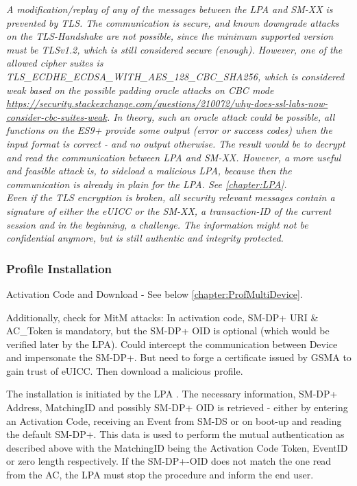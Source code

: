 \textit{A modification/replay of any of the messages between the LPA and SM-XX is prevented by TLS. The communication is secure, and known downgrade attacks on the TLS-Handshake are not possible, since the minimum supported version must be TLSv1.2, which is still considered secure (enough). However, one of the allowed cipher suites is  TLS\_ECDHE\_ECDSA\_WITH\_AES\_128\_CBC\_SHA256, which is considered weak based on the possible padding oracle attacks on CBC mode \url{https://security.stackexchange.com/questions/210072/why-does-ssl-labs-now-consider-cbc-suites-weak}. In theory, such an oracle attack could be possible, all functions on the ES9+ provide some output (error or success codes) when the input format is correct - and no output otherwise. The result would be to decrypt and read the communication between LPA and SM-XX. However, a more useful and feasible attack is, to sideload a malicious LPA, because then the communication is already in plain for the LPA. See \ref{chapter:LPA}. \\
Even if the TLS encryption is broken, all security relevant messages contain a signature of either the eUICC or the SM-XX, a transaction-ID of the current session and in the beginning, a challenge. The information might not be confidential anymore, but is still authentic and integrity protected.}


\subsubsection{Profile Installation}
Activation Code and Download - See below \ref{chapter:ProfMultiDevice}. 
    
Additionally, check for MitM attacks: In activation code, SM-DP+ URI \& AC\_Token is mandatory, but the SM-DP+ OID is optional (which would be verified later by the LPA). Could intercept the communication between Device and impersonate the SM-DP+. But need to forge a certificate issued by GSMA to gain trust of eUICC. Then download a malicious profile.
    
The installation is initiated by the LPA . The necessary information, SM-DP+ Address, MatchingID and possibly SM-DP+ OID is retrieved - either by entering an Activation Code, receiving an Event from SM-DS or on boot-up and reading the default SM-DP+. This data is used to perform the mutual authentication as described above with the MatchingID being the Activation Code Token, EventID or zero length respectively. If the SM-DP+-OID does not match the one read from the AC, the LPA must stop the procedure and inform the end user.

